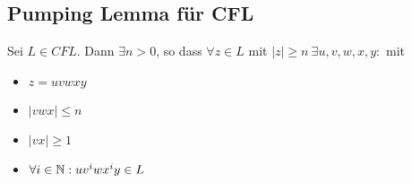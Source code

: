 \subsection{Pumping Lemma für \acs*{CFL}}
\begin{Satz}
\label{satz:PL für CFL}
	Sei $L\in {CFL}$. Dann $\exists n>0$, so dass $\forall z\in L$ mit $|z|\geq n\ \exists u,v,w,x,y:$ mit
	\begin{itemize}
	\item $z=uvwxy$
	\item $|vwx|\leq n$
	\item $|vx|\geq 1$
	\item $\forall i \in \mathbb{N} : uv^iwx^iy\in L$
	\end{itemize}
\end{Satz}
